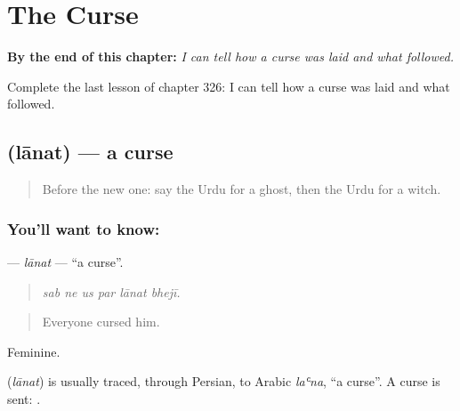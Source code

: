 
\chapter{The Curse}
\label{ch:ur-the-curse}

\begin{chapteropening}
\textbf{By the end of this chapter:} \emph{I can tell how a curse was laid and what followed.}

Complete the last lesson of chapter 326: I can tell how a curse was laid and what followed.
\end{chapteropening}

\section[\texorpdfstring{\ur{لعنت} (lānat)}{لعنت (lānat)}]{ (lānat) — a curse}

\label{lesson:UR-C326-lanat}



\begin{quote}
Before the new one: say the Urdu for a ghost, then the Urdu for a witch.
\end{quote}

\subsection*{You'll want to know: }
\textbf{} — \emph{lānat} — \textquotedblleft{}a curse\textquotedblright{}.

\begin{quote}
     
\end{quote}

\begin{quote}
\emph{sab ne us par lānat bhejī.}
\end{quote}

\begin{quote}
Everyone cursed him.
\end{quote}

Feminine.

\begin{cousinweb}
\textbf{} (\emph{lānat}) is usually traced, through Persian, to Arabic \emph{laʿna}, \textquotedblleft{}a curse\textquotedblright{}. A curse is sent: \textbf{ }.
\end{cousinweb}

